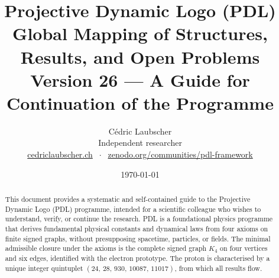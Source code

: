 \documentclass[11pt,a4paper]{article}
\title{Projective Dynamic Logo (PDL)\\[4pt]
\large Global Mapping of Structures, Results, and Open Problems\\[2pt]
\normalsize Version 26 --- A Guide for Continuation of the Programme}
\author{C\'edric Laubscher\\[4pt]
\small Independent researcher\\
\small \href{https://cedriclaubscher.ch}{cedriclaubscher.ch}
$\;\cdot\;$
\small \href{https://zenodo.org/communities/pdl-framework/}{zenodo.org/communities/pdl-framework}}
\date{\today}
\theoremstyle{plain}
\theoremstyle{definition}
\theoremstyle{remark}
\newcommand{\Kfour}{K_4}
\newcommand{\quintuplet}{(24,\,28,\,930,\,10087,\,11017)}
\begin{document}
\maketitle
\setcounter{tocdepth}{2}

\begin{abstract}
This document provides a systematic and self-contained guide to the Projective Dynamic Logo (PDL) programme, intended for a scientific colleague who wishes to understand, verify, or continue the research. PDL is a foundational physics programme that derives fundamental physical constants and dynamical laws from four axioms on finite signed graphs, without presupposing spacetime, particles, or fields. The minimal admissible closure under the axioms is the complete signed graph $\Kfour$ on four vertices and six edges, identified with the electron prototype. The proton is characterised by a unique integer quintuplet $\quintuplet$, from which all results flow.


\end{abstract}
\end{document}
